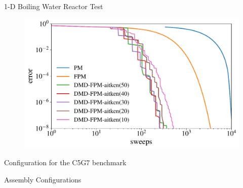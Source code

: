 \documentclass[fleqn]{beamer}
\begin{document}
\begin{frame}{1-D Boiling Water Reactor Test}
    \begin{figure}
        \centering
        \includegraphics[height=0.65\paperheight]{figures/dmd_ospi_loglog_1d.pdf}
    \end{figure}
\end{frame}

\begin{frame}{Configuration for the C5G7 benchmark\footnotemark}
    \begin{figure}
        \centering
        
    \end{figure}
\end{frame}

\begin{frame}{Assembly Configurations}
    \begin{columns}[c]
        \begin{column}{.45\textwidth}
            \begin{figure}
                \centering
                
            \end{figure}
        \end{column}
        \begin{column}{.45\textwidth}
            \begin{figure}
                \centering
                
            \end{figure}
        \end{column}
    \end{columns}
\end{frame}
\end{document}
